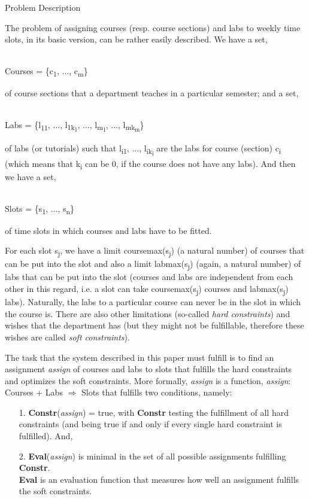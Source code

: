\documentclass[11pt, oneside]{article}   	%
\begin{document}
\centerline{{\Large Problem Description}}
\par The problem of assigning courses (resp. course sections) and labs to weekly time slots, in its basic version, can be rather easily described. We have a set,\\\\
\centerline{Courses = \{c\textsubscript{1}, $\ldots$, c\textsubscript{m}\}}
\par\noindent of course sections that a department teaches in a particular semester; and a set,\\\\
\centerline{Labs = \{l\textsubscript{11}, $\ldots$, l\textsubscript{1k\textsubscript{1}}, $\ldots$, l\textsubscript{m\textsubscript{1}}, $\ldots$, l\textsubscript{mk\textsubscript{m}}\}}
\par\noindent of labs (or tutorials) such that l\textsubscript{i1}, $\ldots$, l\textsubscript{ik\textsubscript{i}} are the labs for course (section) c\textsubscript{i} (which means that k\textsubscript{i} can be 0, if the course does not have any labs). And then we have a set,\\\\
\centerline{Slots = \{s\textsubscript{1}, $\ldots$, s\textsubscript{n}\}}
\par\noindent of time slots in which courses and labs have to be fitted.
\par For each slot s\textsubscript{j}, we have a limit coursemax(s\textsubscript{j}) (a natural number) of courses that can be put into the slot and also a limit labmax(s\textsubscript{j}) (again, a natural number) of labs that can be put into the slot (courses and labs are independent from each other in this regard, i.e. a slot can take coursemax(s\textsubscript{j}) courses and labmax(s\textsubscript{j}) labs). Naturally, the labs to a particular course can never be in the slot in which the course is. There are also other limitations (so-called \textit{hard constraints}) and wishes that the department has (but they might not be fulfillable, therefore these wishes are called \textit{soft constraints}).

\par The task that the system described in this paper must fulfill is to find an assignment \textit{assign} of courses and labs to slots that fulfills the hard constraints and optimizes the soft constraints. More formally, \textit{assign} is a function, \textit{assign}: Courses + Labs $\Rightarrow$ Slots that fulfills two conditions, namely:
\begin{itemize}[topsep=0pt]
\item[1.] \textbf{Constr}(\textit{assign}) = true, with \textbf{Constr} testing the fulfillment of all hard constraints (and being true if and only if every single hard constraint is fulfilled). And,
\item[2.] \textbf{Eval}(\textit{assign}) is minimal in the set of all possible assignments fulfilling \textbf{Constr}. \\ \textbf{Eval} is an evaluation function that measures how well an assignment fulfills the soft constraints.
\end{itemize}
\end{document}
